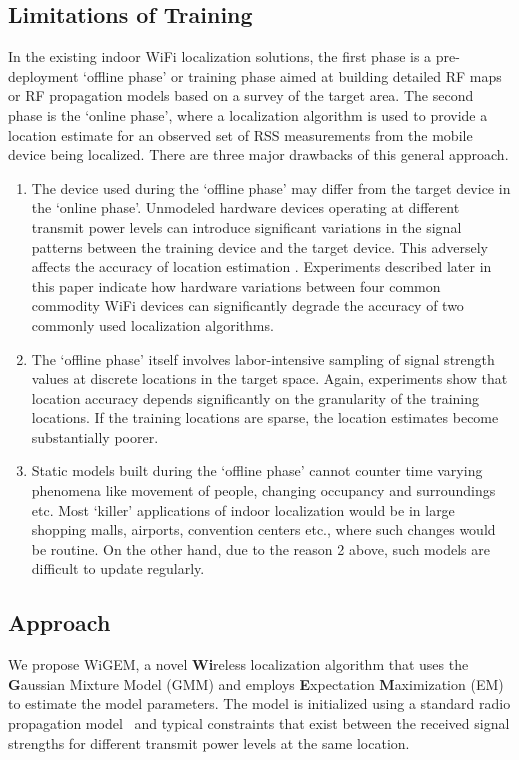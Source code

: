 \subsection{Limitations of Training}
\label{subsec:limitationsoftraining}

In the existing indoor WiFi localization solutions, the first phase is a pre-deployment `offline phase' or training phase aimed at building detailed RF maps or RF propagation models based on a survey of the target area. The second phase is the `online phase', where a localization algorithm is used to provide a location estimate for an observed set of RSS measurements from the mobile device being localized. There are three major drawbacks of this general approach. 
\begin{enumerate}
\item
The device used during the `offline phase' may differ from the target device in the `online phase'. Unmodeled hardware devices operating at different transmit power levels can introduce significant variations in the signal patterns between the training device and the target device. This adversely affects the accuracy of location estimation \cite{Tsui:2009:ULS:1741410.1741596}. Experiments described later in this paper indicate how hardware variations between four common commodity WiFi devices can significantly degrade the accuracy of two commonly used localization algorithms. 
\item
The `offline phase' itself involves labor-intensive sampling of signal strength values at discrete locations in the target space. Again, experiments show that location accuracy depends significantly on the granularity of the training locations. If the training locations are sparse, the location estimates become substantially poorer.
\item
Static models built during the `offline phase' cannot counter time varying phenomena like movement of people, changing occupancy and surroundings etc. Most 
`killer' applications of indoor localization would be in large shopping malls, airports, 
convention centers etc., where such changes would be routine. 
On the other hand, due to the reason 2 above, such models are difficult to update regularly. 
\end{enumerate}

\subsection{Approach}

We propose WiGEM, a novel {\bf Wi}reless
localization algorithm that uses the {\bf G}aussian Mixture Model (GMM) and employs {\bf E}xpectation 
{\bf M}aximization (EM) to estimate the model parameters. 
The model is initialized 
using  a standard radio propagation model~\cite{Rappaport:2001:WCP:559977, Molkdar91} 
and typical constraints that exist between the received signal strengths for different transmit 
power levels at the same 
location.

